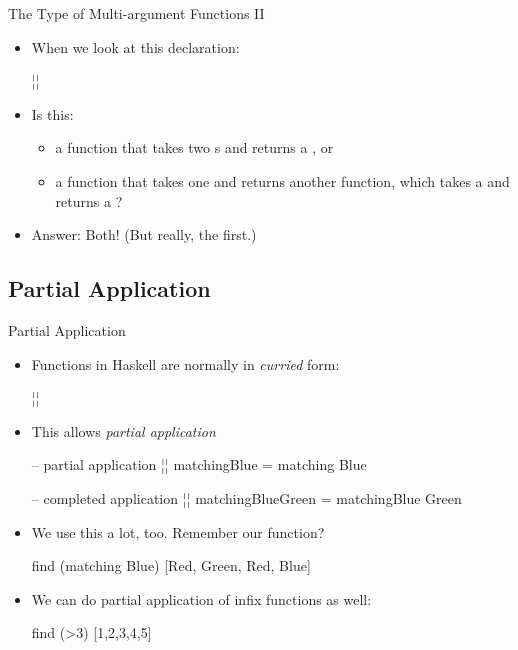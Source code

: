\documentclass[xcolor=dvipsnames]{beamer}          %
\newcommand{\lH}[1]{\color{MidnightBlue}{#1}}
\newcommand{\lT}[1]{\color{Fuchsia}{#1}}        %
\begin{document}
\begin{frame}[fragile]{The Type of Multi-argument Functions II}
\begin{itemize}
    \item When we look at this declaration:
        \begin{hlisting}
            ¦\lT{matching :: Color -> Color -> Bool}¦
        \end{hlisting}
    \item Is this:
        \begin{itemize}
            \item a function that takes two s and returns a
                , or
            \item a function that takes one  and returns another
                function, which takes a  and returns a ?
        \end{itemize}
    \item<2->Answer: Both! (But really, the first.)
\end{itemize}
\end{frame}


\subsection{Partial Application}

\begin{frame}[fragile]{Partial Application}
\begin{itemize}
    \item Functions in Haskell are normally in \emph{curried} form:
        \begin{hlisting}
            ¦\lT{matching :: Color -> Color -> Bool}¦
        \end{hlisting}
    \item This allows \emph{partial application}
        \begin{hlisting}
            -- partial application
            ¦\lT{matchingBlue :: Color -> Bool}¦
            matchingBlue = matching Blue

            -- completed application
            ¦\lT{matchingBlueGreen :: Bool}¦
            matchingBlueGreen = matchingBlue Green
        \end{hlisting}
    \item We use this a lot, too. Remember our \T{\lH{find}} function?
        \begin{hlisting}
            find (matching Blue) [Red, Green, Red, Blue]
        \end{hlisting}
    \item We can do partial application of infix functions as well:
        \begin{hlisting}
            find (>3) [1,2,3,4,5]
        \end{hlisting}
\end{itemize}
\end{frame}
\end{document}
